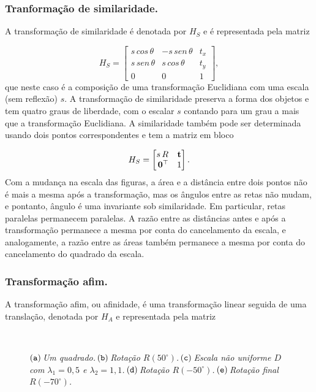\subsubsection*{Tranformação de similaridade.}
A transformação de similaridade é denotada por $H_S$ e é representada pela matriz 

\begin{equation*}
H_S=
\begin{bmatrix}
s\,cos\,\theta&-s\,sen\,\theta&t_x\\
s\,sen\,\theta&s\,cos\,\theta&t_y\\
0&0&1
\end{bmatrix},
\end{equation*} 
que neste caso é a composição de uma transformação Euclidiana com uma escala (sem reflexão) $s$. A transformação de similaridade preserva a forma dos objetos e tem quatro graus de liberdade, com o escalar $s$ contando para um grau a mais que a transformação Euclidiana. A similaridade também pode ser determinada usando dois pontos correspondentes e tem a matriz em bloco

\begin{equation*}
H_S=
\begin{bmatrix}
s\,R&{\bf t}\\
\,{\bf 0}^\top&1
\end{bmatrix}.
\end{equation*}
Com a mudança na escala das figuras, a área e a distância entre dois pontos não é mais a mesma após a transformação, mas os ângulos entre as retas não mudam, e pontanto, ângulo é uma invariante sob similaridade. Em particular, retas paralelas permanecem paralelas. A razão entre as distâncias antes e após a transformação permanece a mesma por conta do cancelamento da escala, e analogamente, a razão entre as áreas também permanece a mesma por conta do cancelamento do quadrado da escala.

\subsubsection*{Transformação afim.}
A transformação afim, ou afinidade, é uma transformação linear seguida de uma translação, denotada por $H_A$ e representada pela matriz

\begin{figure}[!htb]
\centering
{}
\,
\,
\,
\,
\caption{$({\tt a})\,$\textit{Um quadrado.}$\,({\tt b})\,$\textit{Rotação $R(50^\circ)$.}$\,({\tt c})\,$\textit{Escala não uniforme $D$ com $\lambda_1=0,5$ e $\lambda_2=1,1$.}$\,({\tt d})\,$\textit{Rotação $R(-50^\circ)$.}$\,({\tt e})\,$\textit{Rotação final $R(-70^\circ)$.}}
\label{fig.angulos-afinidades}
\end{figure}

